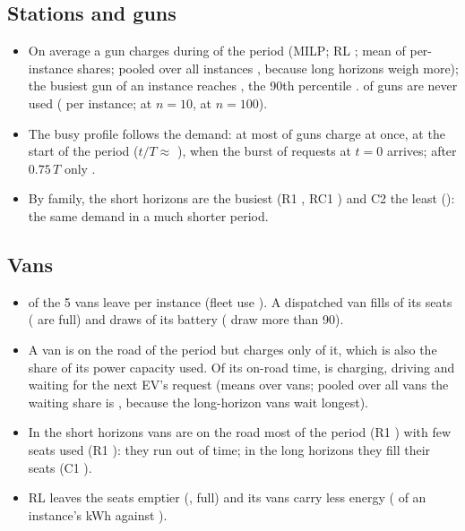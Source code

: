 \subsection{Stations and guns}
\begin{itemize}
  \item On average a gun charges during \UGunMilp\pct{} of the period (MILP; RL \UGunRl\pct; mean of per-instance shares; pooled over all instances \UGunPooledMilp\pct, because long horizons weigh more); the busiest gun of an instance reaches \UGunMaxMilp\pct{}, the 90th percentile \UGunPninetyMilp\pct. \UIdleGunShareMilp\pct{} of guns are never used (\UIdleGunsMilp{} per instance; \UIdleGunsMilpNten{} at $n=10$, \UIdleGunsMilpNhundred{} at $n=100$).
  \item The busy profile follows the demand: at most \UPeakGunsBusy\pct{} of guns charge at once, at the start of the period ($t/T\approx$ \UPeakGunsAt), when the burst of requests at $t=0$ arrives; after $0.75\,T$ only \ULateGunsBusy\pct{}.
  \item By family, the short horizons are the busiest (R1 \UGunFamRone\pct{}, RC1 \UGunFamRCone\pct) and C2 the least (\UGunFamCtwo\pct): the same demand in a much shorter period.
\end{itemize}

\subsection{Vans}
\begin{itemize}
  \item \UVansUsedMilp{} of the 5 vans leave per instance (fleet use \UFleetMilp\pct). A dispatched van fills \USeatMilp\pct{} of its seats (\UFullMilp\pct{} are full) and draws \UBatteryMilp\pct{} of its battery (\UBninetyMilp\pct{} draw more than 90\pct).
  \item A van is on the road \UOnRoadMilp\pct{} of the period but charges only \UChargeMilp\pct{} of it, which is also the share of its power capacity used. Of its on-road time, \UChargeVanMilp\pct{} is charging, \UDriveVanMilp\pct{} driving and \UIdleVanMilp\pct{} waiting for the next EV's request (means over vans; pooled over all vans the waiting share is \UIdleVanPooledMilp\pct, because the long-horizon vans wait longest).
  \item In the short horizons vans are on the road most of the period (R1 \UOnRoadFamRone\pct) with few seats used (R1 \USeatFamRone\pct): they run out of time; in the long horizons they fill their seats (C1 \USeatFamCone\pct).
  \item RL leaves the seats emptier (\USeatRl\pct, \UFullRl\pct{} full) and its vans carry less energy (\UVanEnergyRl\pct{} of an instance's kWh against \UVanEnergyMilp\pct).
\end{itemize}

